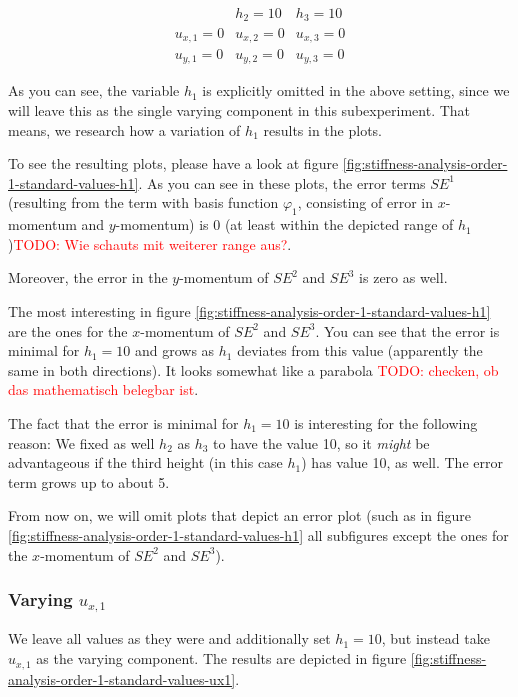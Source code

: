 \documentclass{article}
\newcommand{\todo}[1]{\textcolor{red}{TODO: #1}}
\renewcommand{\phi}{\varphi}
\begin{document}
\begin{eqnarray*}
  & h_2 = 10 & h_3 = 10 \\
  u_{x,1} = 0 & u_{x,2} = 0 & u_{x,3} = 0 \\
  u_{y,1} = 0 & u_{y,2} = 0 & u_{y,3} = 0
\end{eqnarray*}

As you can see, the variable $h_1$ is explicitly omitted in the above setting, since we will leave this as the single varying component in this subexperiment. That means, we research how a variation of $h_1$ results in the plots.



To see the resulting plots, please have a look at figure \ref{fig:stiffness-analysis-order-1-standard-values-h1}. As you can see in these plots, the error terms $SE^1$ (resulting from the term with basis function $\phi_1$, consisting of error in $x$-momentum and $y$-momentum) is 0 (at least within the depicted range of $h_1$)\todo{Wie schauts mit weiterer range aus?}.

Moreover, the error in the $y$-momentum of $SE^2$ and $SE^3$ is zero as well.

The most interesting in figure \ref{fig:stiffness-analysis-order-1-standard-values-h1} are the ones for the $x$-momentum of $SE^2$ and $SE^3$. You can see that the error is minimal for $h_1=10$ and grows as $h_1$ deviates from this value (apparently the same in both directions). It looks somewhat like a parabola \todo{checken, ob das mathematisch belegbar ist}.

The fact that the error is minimal for $h_1=10$ is interesting for the following reason: We fixed as well $h_2$ as $h_3$ to have the value 10, so it \emph{might} be advantageous if the third height (in this case $h_1$) has value 10, as well. The error term grows up to about 5.

From now on, we will omit plots that depict an error plot (such as in figure \ref{fig:stiffness-analysis-order-1-standard-values-h1} all subfigures except the ones for the $x$-momentum of $SE^2$ and $SE^3$).

\subsubsection{Varying $u_{x,1}$}

We leave all values as they were and additionally set $h_1=10$, but instead take $u_{x,1}$ as the varying component. The results are depicted in figure \ref{fig:stiffness-analysis-order-1-standard-values-ux1}.
\end{document}
